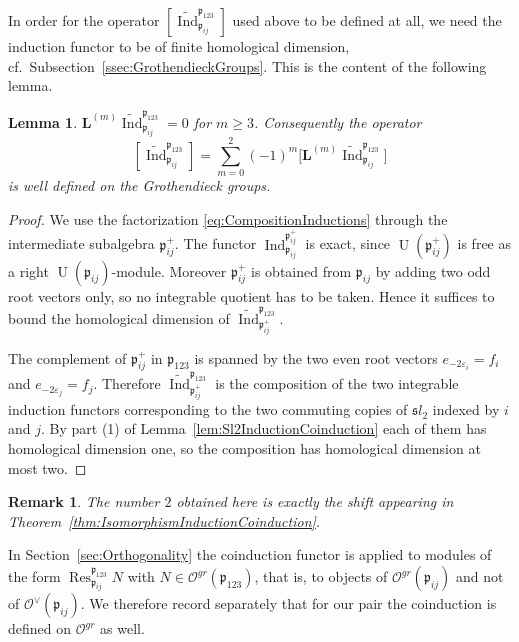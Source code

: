 \documentclass[10pt]{amsart}
\newtheorem{lemma}[theorem]{Lemma}
\newtheorem{remark}[theorem]{Remark}
\newcommand{\fsl}{{\mathfrak sl}}
\newcommand{\fp}{{\mathfrak p}}
\DeclareMathOperator{\Res}{Res}
\DeclareMathOperator{\Ind}{Ind}
\DeclareMathOperator{\U}{U}
\begin{document}
	In order for the operator $[\widetilde{\Ind}_{\fp_{ij}}^{\fp_{123}}]$ used above to be defined at all, we need the induction functor to be of finite homological dimension, cf.\ Subsection~\ref{ssec:GrothendieckGroups}. This is the content of the following lemma.
	
	\begin{lemma}\label{lem:FiniteHomologicalDimension}
		$\mathbf{L}^{(m)}\widetilde{\Ind}_{\fp_{ij}}^{\fp_{123}}=0$ for $m \geq 3$. Consequently the operator
		\[[\widetilde{\Ind}_{\fp_{ij}}^{\fp_{123}}]=\sum_{m=0}^{2}(-1)^m\bigl[\mathbf{L}^{(m)}\widetilde{\Ind}_{\fp_{ij}}^{\fp_{123}}\bigr]\]
		is well defined on the Grothendieck groups.
	\end{lemma}
	\begin{proof}
		We use the factorization \eqref{eq:CompositionInductions} through the intermediate subalgebra $\fp_{ij}^+$. The functor $\Ind^{\fp_{ij}^+}_{\fp_{ij}}$ is exact, since $\U(\fp_{ij}^+)$ is free as a right $\U(\fp_{ij})$-module. Moreover $\fp_{ij}^+$ is obtained from $\fp_{ij}$ by adding two odd root vectors only, so no integrable quotient has to be taken. Hence it suffices to bound the homological dimension of $\widetilde{\Ind}_{\fp_{ij}^+}^{\fp_{123}}$.
		
		The complement of $\fp_{ij}^+$ in $\fp_{123}$ is spanned by the two even root vectors $e_{-2\varepsilon_i}=f_i$ and $e_{-2\varepsilon_j}=f_j$. Therefore $\widetilde{\Ind}_{\fp_{ij}^+}^{\fp_{123}}$ is the composition of the two integrable induction functors corresponding to the two commuting copies of $\fsl_2$ indexed by $i$ and $j$. By part (1) of Lemma~\ref{lem:Sl2InductionCoinduction} each of them has homological dimension one, so the composition has homological dimension at most two.
	\end{proof}
	\begin{remark}
		The number $2$ obtained here is exactly the shift appearing in Theorem~\ref{thm:IsomorphismInductionCoinduction}.
	\end{remark}
	
	In Section~\ref{sec:Orthogonality} the coinduction functor is applied to modules of the form $\Res_{\fp_{ij}}^{\fp_{123}}N$ with $N \in \mathcal{O}^{gr}(\fp_{123})$, that is, to objects of $\mathcal{O}^{gr}(\fp_{ij})$ and not of $\mathcal{O}^{\vee}(\fp_{ij})$. We therefore record separately that for our pair the coinduction is defined on $\mathcal{O}^{gr}$ as well.
	
\end{document}
